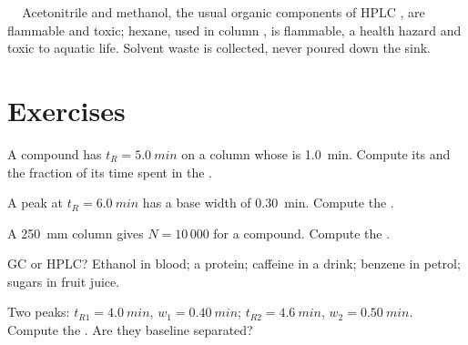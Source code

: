 \begin{safety}{\,\,\,\,\,}
Acetonitrile and methanol, the usual organic components of HPLC , are flammable and toxic;
hexane, used in column , is flammable, a health hazard and toxic to aquatic life.
Solvent waste is collected, never poured down the sink.
\end{safety}

\section{Exercises}

\begin{exercise}[$\star$]\label{exo:b2:chromatography:1}
A compound has $t_R = \qty{5.0}{min}$ on a column whose  is \qty{1.0}{min}. Compute its
 and the fraction of its time spent in the .
\end{exercise}

\begin{exercise}[$\star$]\label{exo:b2:chromatography:2}
A peak at $t_R = \qty{6.0}{min}$ has a base width of \qty{0.30}{min}. Compute the .
\end{exercise}

\begin{exercise}[$\star$]\label{exo:b2:chromatography:3}
A \qty{250}{mm} column gives $N = 10\,000$ for a compound. Compute the .
\end{exercise}

\begin{exercise}[$\star$]\label{exo:b2:chromatography:4}
GC or HPLC? Ethanol in blood; a protein; caffeine in a drink; benzene in petrol; sugars in fruit juice.
\end{exercise}

\begin{exercise}[$\star\star$]\label{exo:b2:chromatography:5}
Two peaks: $t_{R1} = \qty{4.0}{min}$, $w_1 = \qty{0.40}{min}$; $t_{R2} = \qty{4.6}{min}$, $w_2 =
\qty{0.50}{min}$. Compute the . Are they baseline separated?
\end{exercise}

